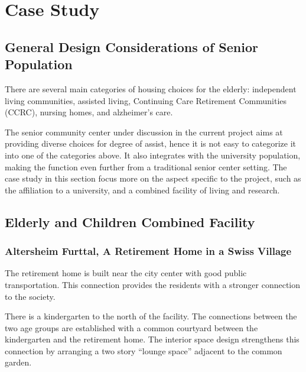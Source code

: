 
\chapter{Case Study} %

\label{Chapter2} %



\section{General Design Considerations of Senior Population}
There are several main categories of housing choices for the elderly:
independent living communities, assisted living, Continuing Care
Retirement Communities (CCRC), nursing homes, and alzheimer's care.

The senior community center under discussion in the current project
aims at providing diverse choices for degree of assist, hence it is
not easy to categorize it into one of the categories above. It also
integrates with the university population, making the function even
further from a traditional senior center setting. The case study in
this section focus more on the aspect specific to the project, such as
the affiliation to a university, and a combined facility of living and
research.

\section{Elderly and Children Combined Facility}
\subsection{Altersheim Furttal, A Retirement Home in a Swiss Village}
The retirement home is built near the city center with good public
transportation. This connection provides the residents with a stronger
connection to the society.

There is a kindergarten to the north of the facility. The connections
between the two age groups are established with a common courtyard
between the kindergarten and the retirement home. The interior space
design strengthens this connection by arranging a two story ``lounge
space'' adjacent to the common garden.

